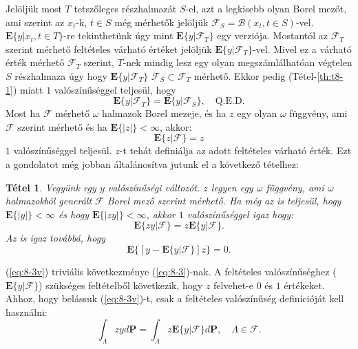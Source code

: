 \documentclass{article}
\newtheorem{theorem}{Tétel}
\begin{document}
Jelöljük most $T$ tetszőleges részhalmazát $S$-el, azt a legkisebb olyan Borel mezőt, ami szerint az $x_t$-k, $t \in S$ még mérhetők jelöljük $\mathscr{F}_S = \mathscr{B}(x_t, t \in S)$-vel. $\mathrm{\textbf{E}}\{y | x_t, t \in T \}$-re tekinthetünk úgy mint $\mathrm{\textbf{E}}\{y | \mathscr{F}_T \}$ egy verziója. Mostantól az $\mathscr{F}_T$ szerint mérhető feltételes várható értéket jelöljük $\mathrm{\textbf{E}}\{y | \mathscr{F}_T \}$-vel. Mivel ez a várható érték mérhető $\mathscr{F}_T$ szerint, $T$-nek mindig lesz egy olyan megszámlálhatóan végtelen $S$ részhalmaza úgy hogy $\mathrm{\textbf{E}}\{y | \mathscr{F}_T \}$ $\mathscr{F}_S \subset \mathscr{F}_T$ mérhető. Ekkor pedig (Tétel-\ref{th:t8-1}) miatt $1$ valószínűséggel teljesül, hogy 
\[
 \mathrm{\textbf{E}}\{y | \mathscr{F}_T \} = \mathrm{\textbf{E}}\{y | \mathscr{F}_S \}, \quad \mathrm{Q.E.D.}
\]
Most ha $\mathscr{F}$ mérhető $\omega$ halmazok Borel mezeje, és ha $z$ egy olyan $\omega$ függvény, ami $\mathscr{F}$ szerint mérhető és ha $\mathrm{\textbf{E}}\{|z|\} < \infty$, akkor:
\[
	\mathrm{\textbf{E}}\{z | \mathscr{F} \} = z
\]
$1$ valószínűséggel teljesül. $z$-t tehát definiálja az adott feltételes várható érték. Ezt a gondolatot még jobban általánosítva jutunk el a következő tételhez:
\begin{theorem}
	Vegyünk egy $y$ valószínűségi változót. $z$ legyen egy $\omega$ függvény, ami $\omega$ halmazokból generált $\mathscr{F}$ Borel mező szerint mérhető. Ha még az is teljesül, hogy $\mathrm{\textbf{E}}\{|y|\} < \infty$ és hogy $\mathrm{\textbf{E}}\{|zy|\} < \infty$, akkor $1$ valószínűséggel igaz hogy:
	\begin{equation}
		\mathrm{\textbf{E}}\{zy | \mathscr{F} \} = z \mathrm{\textbf{E}}\{y | \mathscr{F} \}.
		\label{eq:8-3}
	\end{equation}
	Az is igaz továbbá, hogy
	\begin{equation}
		\mathrm{\textbf{E}}\{[y - \mathrm{\textbf{E}}\{y | \mathscr{F} \} ]z \} = 0.
		\label{eq:8-3v}
	\end{equation}
\end{theorem}
(\ref{eq:8-3v}) triviális következménye (\ref{eq:8-3})-nak. A feltételes valószínűséghez ($\mathrm{\textbf{E}}\{y | \mathscr{F} \}$) szükséges feltételből következik, hogy $z$ felvehet-e $0$ és $1$ értékeket. Ahhoz, hogy belássuk (\ref{eq:8-3v})-t, csak a feltételes valószínűség definícióját kell használni: 
\begin{equation}
 \int_{\Lambda} zy d\mathrm{\textbf{P}} = \int_{\Lambda} z \mathrm{\textbf{E}}\{y | \mathscr{F} \} d\mathrm{\textbf{P}}, \quad \Lambda \in \mathscr{F}.
\end{equation}
\end{document}
